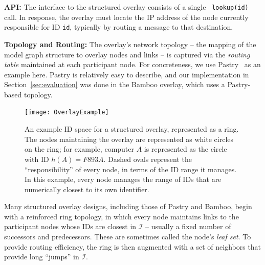\documentclass[10pt,twocolumn]{article}
\renewcommand{\paragraph}[1]{\textbf{#1:}}
\begin{document}
\paragraph{API}
The interface to the structured overlay consists of a single {\tt
lookup(id)} call.  In response, the overlay must locate the IP
address of the node currently responsible for ID {\tt id}, typically by
routing a message to that destination.

\paragraph{Topology and Routing}
The overlay's network topology -- the mapping of the model graph
structure to overlay nodes and links -- is captured via the {\em routing table}
maintained at each participant node.  For concreteness, we use Pastry~\cite{Rowstron2001} as an example
here.  Pastry is relatively easy to describe, and our implementation in
Section~\ref{sec:evaluation} was done in the Bamboo overlay, which uses a
Pastry-based topology.

\begin{figure}
\centerline{\texttt{[image: OverlayExample]}}
\caption{An example ID space for a structured overlay, represented as a ring.
  The nodes maintaining the overlay are represented as white circles on the
  ring; for example, computer $A$ is represented as the circle with
  ID $h(A)=F893A$. Dashed ovals represent the
  ``responsibility'' of every node, in terms of the ID range it
  manages.  In this example, every node manages the range of IDs that
  are numerically closest to its own identifier.}
\label{fig:OverlayExample}
\end{figure}


Many structured overlay designs, including those of Pastry and Bamboo, begin with a
reinforced ring topology, in which every node maintains links to the
participant nodes whose IDs are closest in $\mathcal{I}$ -- usually a
fixed number of successors and predecessors.  These are sometimes
called the node's \emph{leaf set}.  To provide routing efficiency, the ring is then
augmented with a set of neighbors that provide long ``jumps'' in
$\mathcal{I}$.
\end{document}
